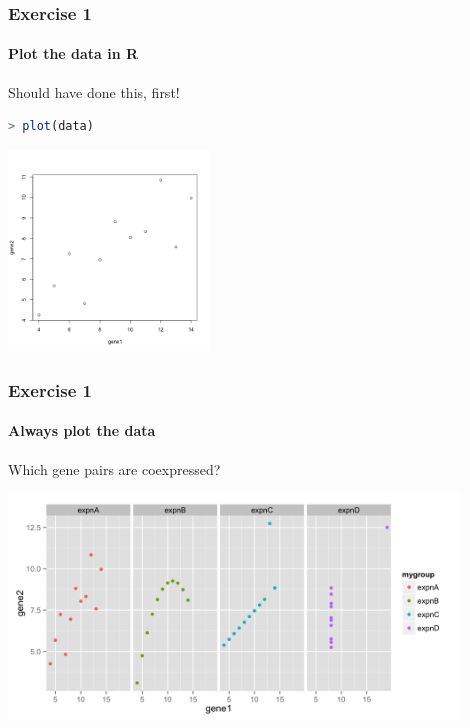\documentclass[table]{beamer}
\begin{document}
  \begin{frame}[fragile]
    \frametitle{Exercise 1}
    \framesubtitle{Plot the data in R}
    Should have done this, first! \\
    \begin{lstlisting}[language=R]
> plot(data)
    \end{lstlisting}
    \begin{center}
      \includegraphics[width=0.4\textwidth]{images/ex1_screenshot_d}        
    \end{center}
\end{frame}

  \begin{frame}
    \frametitle{Exercise 1}
    \framesubtitle{Always plot the data}
    Which gene pairs are coexpressed?
    \begin{center}
      \includegraphics[width=0.9\textwidth]{images/ex1_rplot} \\
    \end{center}
  \end{frame}
\end{document}
